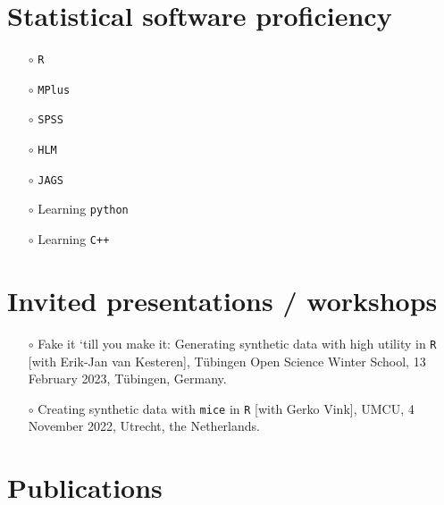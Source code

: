 \documentclass[11pt,a4paper,roman,colorlinks,linkcolor = blue]{moderncv}        %
\begin{document}
{%

\section{Statistical software proficiency}
{\begin{minipage}{\maincolumnwidth}%
	\small{
  \begin{itemize}
    \item[$\circ$] \texttt{R}
    \item[$\circ$] \texttt{MPlus}
    \item[$\circ$] \texttt{SPSS}
    \item[$\circ$] \texttt{HLM}
    \item[$\circ$] \texttt{JAGS}
    \item[$\circ$] Learning \texttt{python}
    \item[$\circ$] Learning \texttt{C++}
  \end{itemize}}
\end{minipage}}
}

\section{Invited presentations / workshops}

\begin{itemize}

\item[$\circ$] Fake it ‘till you make it: Generating synthetic data with high utility in \texttt{R} [with Erik-Jan van Kesteren], T{\"u}bingen Open Science Winter School, 13 February 2023, T{\"u}bingen, Germany.

\item[$\circ$] Creating synthetic data with \texttt{mice} in \texttt{R} [with Gerko Vink], UMCU, 4 November
2022, Utrecht, the Netherlands.

\end{itemize}


\section{Publications}
\end{document}
